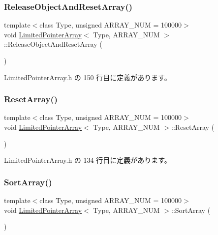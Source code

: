 \subsubsection{\texorpdfstring{Release\+Object\+And\+Reset\+Array()}{ReleaseObjectAndResetArray()}}
{\footnotesize\ttfamily template$<$class Type, unsigned A\+R\+R\+A\+Y\+\_\+\+N\+UM = 100000$>$ \\
void \mbox{\hyperlink{class_limited_pointer_array}{Limited\+Pointer\+Array}}$<$ Type, A\+R\+R\+A\+Y\+\_\+\+N\+UM $>$\+::Release\+Object\+And\+Reset\+Array (\begin{DoxyParamCaption}{ }\end{DoxyParamCaption})\hspace{0.3cm}{\ttfamily [inline]}}



 Limited\+Pointer\+Array.\+h の 150 行目に定義があります。

\mbox{\label{class_limited_pointer_array_ae5a41fe945c1ee5ea73116b823011a8c}} 
\subsubsection{\texorpdfstring{Reset\+Array()}{ResetArray()}}
{\footnotesize\ttfamily template$<$class Type, unsigned A\+R\+R\+A\+Y\+\_\+\+N\+UM = 100000$>$ \\
void \mbox{\hyperlink{class_limited_pointer_array}{Limited\+Pointer\+Array}}$<$ Type, A\+R\+R\+A\+Y\+\_\+\+N\+UM $>$\+::Reset\+Array (\begin{DoxyParamCaption}{ }\end{DoxyParamCaption})\hspace{0.3cm}{\ttfamily [inline]}}



 Limited\+Pointer\+Array.\+h の 134 行目に定義があります。

\mbox{\label{class_limited_pointer_array_a1093a96cb123b3fed52bdfcea1055f33}} 
\subsubsection{\texorpdfstring{Sort\+Array()}{SortArray()}}
{\footnotesize\ttfamily template$<$class Type, unsigned A\+R\+R\+A\+Y\+\_\+\+N\+UM = 100000$>$ \\
void \mbox{\hyperlink{class_limited_pointer_array}{Limited\+Pointer\+Array}}$<$ Type, A\+R\+R\+A\+Y\+\_\+\+N\+UM $>$\+::Sort\+Array (\begin{DoxyParamCaption}{ }\end{DoxyParamCaption})\hspace{0.3cm}{\ttfamily [inline]}}



